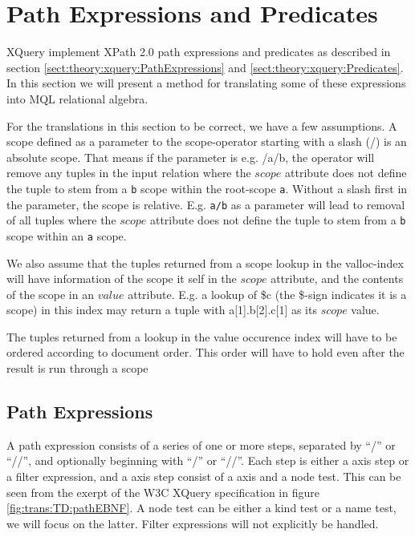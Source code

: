 \section{Path Expressions and Predicates}
\label{sect:trans:TD:pathNpred}

XQuery implement XPath 2.0 path expressions and predicates as described in section
\ref{sect:theory:xquery:PathExpressions} and \ref{sect:theory:xquery:Predicates}. In this section we will present
a method for translating some of these expressions into MQL relational algebra.

For the translations in this section to be correct, we have a few assumptions. A scope defined as a parameter to
the \textsf{scope}-operator starting with a slash (\textsf{/}) is an absolute scope. That means if the parameter
is e.g. \textsf{/a/b}, the operator will remove any tuples in the input relation where the $scope$ attribute does
not define the tuple to stem from a \texttt{b} scope within the root-scope \texttt{a}. Without a slash first in
the parameter, the scope is relative. E.g. \texttt{a/b} as a parameter will lead to removal of all tuples where
the $scope$ attribute does not define the tuple to stem from a \texttt{b} scope within an \texttt{a} scope.

We also assume that the tuples returned from a scope lookup in the \textsf{valloc}-index will have information of
the scope it self in the $scope$ attribute, and the contents of the scope in an $value$ attribute. E.g. a lookup of
\textsf{\$c} (the \textsf{\$}-sign indicates it is a scope) in this index may return a tuple with
\textsf{a[1].b[2].c[1]} as its $scope$ value.

The tuples returned from a lookup in the value occurence index will have to be ordered according to document
order. This order will have to hold even after the result is run through a \textsf{scope}


\subsection{Path Expressions}
\label{sect:trans:TD:pathExprs}
A path expression consists of a series of one or more steps, separated by ``/'' or ``//'', and optionally beginning
with ``/'' or ``//''.  Each step is either a axis step or a filter expression, and a axis step consist of a axis
and a node test. This can be seen from the exerpt of the W3C XQuery specification in figure \ref{fig:trans:TD:pathEBNF}.
A node test can be either a kind test or a name test, we will focus on the latter. Filter expressions will not
explicitly be handled.

